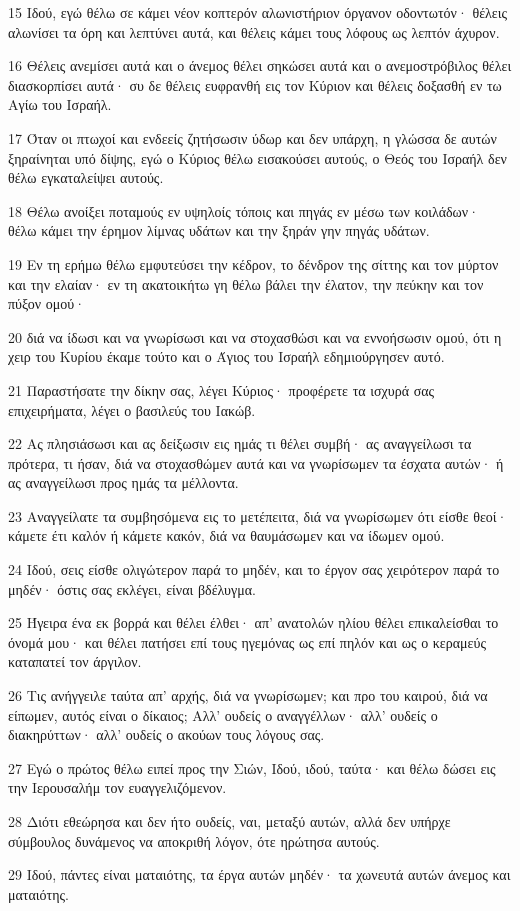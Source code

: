 \par 15 Ιδού, εγώ θέλω σε κάμει νέον κοπτερόν αλωνιστήριον όργανον οδοντωτόν· θέλεις αλωνίσει τα όρη και λεπτύνει αυτά, και θέλεις κάμει τους λόφους ως λεπτόν άχυρον.
\par 16 Θέλεις ανεμίσει αυτά και ο άνεμος θέλει σηκώσει αυτά και ο ανεμοστρόβιλος θέλει διασκορπίσει αυτά· συ δε θέλεις ευφρανθή εις τον Κύριον και θέλεις δοξασθή εν τω Αγίω του Ισραήλ.
\par 17 Όταν οι πτωχοί και ενδεείς ζητήσωσιν ύδωρ και δεν υπάρχη, η γλώσσα δε αυτών ξηραίνηται υπό δίψης, εγώ ο Κύριος θέλω εισακούσει αυτούς, ο Θεός του Ισραήλ δεν θέλω εγκαταλείψει αυτούς.
\par 18 Θέλω ανοίξει ποταμούς εν υψηλοίς τόποις και πηγάς εν μέσω των κοιλάδων· θέλω κάμει την έρημον λίμνας υδάτων και την ξηράν γην πηγάς υδάτων.
\par 19 Εν τη ερήμω θέλω εμφυτεύσει την κέδρον, το δένδρον της σίττης και τον μύρτον και την ελαίαν· εν τη ακατοικήτω γη θέλω βάλει την έλατον, την πεύκην και τον πύξον ομού·
\par 20 διά να ίδωσι και να γνωρίσωσι και να στοχασθώσι και να εννοήσωσιν ομού, ότι η χειρ του Κυρίου έκαμε τούτο και ο Άγιος του Ισραήλ εδημιούργησεν αυτό.
\par 21 Παραστήσατε την δίκην σας, λέγει Κύριος· προφέρετε τα ισχυρά σας επιχειρήματα, λέγει ο βασιλεύς του Ιακώβ.
\par 22 Ας πλησιάσωσι και ας δείξωσιν εις ημάς τι θέλει συμβή· ας αναγγείλωσι τα πρότερα, τι ήσαν, διά να στοχασθώμεν αυτά και να γνωρίσωμεν τα έσχατα αυτών· ή ας αναγγείλωσι προς ημάς τα μέλλοντα.
\par 23 Αναγγείλατε τα συμβησόμενα εις το μετέπειτα, διά να γνωρίσωμεν ότι είσθε θεοί· κάμετε έτι καλόν ή κάμετε κακόν, διά να θαυμάσωμεν και να ίδωμεν ομού.
\par 24 Ιδού, σεις είσθε ολιγώτερον παρά το μηδέν, και το έργον σας χειρότερον παρά το μηδέν· όστις σας εκλέγει, είναι βδέλυγμα.
\par 25 Ήγειρα ένα εκ βορρά και θέλει έλθει· απ' ανατολών ηλίου θέλει επικαλείσθαι το όνομά μου· και θέλει πατήσει επί τους ηγεμόνας ως επί πηλόν και ως ο κεραμεύς καταπατεί τον άργιλον.
\par 26 Τις ανήγγειλε ταύτα απ' αρχής, διά να γνωρίσωμεν; και προ του καιρού, διά να είπωμεν, αυτός είναι ο δίκαιος; Αλλ' ουδείς ο αναγγέλλων· αλλ' ουδείς ο διακηρύττων· αλλ' ουδείς ο ακούων τους λόγους σας.
\par 27 Εγώ ο πρώτος θέλω ειπεί προς την Σιών, Ιδού, ιδού, ταύτα· και θέλω δώσει εις την Ιερουσαλήμ τον ευαγγελιζόμενον.
\par 28 Διότι εθεώρησα και δεν ήτο ουδείς, ναι, μεταξύ αυτών, αλλά δεν υπήρχε σύμβουλος δυνάμενος να αποκριθή λόγον, ότε ηρώτησα αυτούς.
\par 29 Ιδού, πάντες είναι ματαιότης, τα έργα αυτών μηδέν· τα χωνευτά αυτών άνεμος και ματαιότης.


